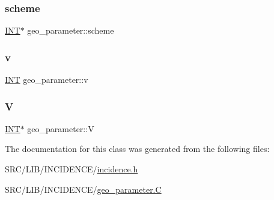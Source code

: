\mbox{\label{classgeo__parameter_af3459e6afcc79c081bc00cdc783301f8}} 
\subsubsection{\texorpdfstring{scheme}{scheme}}
{\footnotesize\ttfamily \mbox{\hyperlink{galois_8h_a09fddde158a3a20bd2dcadb609de11dc}{I\+NT}}$\ast$ geo\+\_\+parameter\+::scheme}

\mbox{\label{classgeo__parameter_a9c47846907cf86b351f4139e57c1127a}} 
\subsubsection{\texorpdfstring{v}{v}}
{\footnotesize\ttfamily \mbox{\hyperlink{galois_8h_a09fddde158a3a20bd2dcadb609de11dc}{I\+NT}} geo\+\_\+parameter\+::v}

\mbox{\label{classgeo__parameter_a253afaf1c892d8d280451e9ce53dd838}} 
\subsubsection{\texorpdfstring{V}{V}}
{\footnotesize\ttfamily \mbox{\hyperlink{galois_8h_a09fddde158a3a20bd2dcadb609de11dc}{I\+NT}}$\ast$ geo\+\_\+parameter\+::V}



The documentation for this class was generated from the following files\+:\begin{DoxyCompactItemize}
\item 
S\+R\+C/\+L\+I\+B/\+I\+N\+C\+I\+D\+E\+N\+C\+E/\mbox{\hyperlink{incidence_8h}{incidence.\+h}}\item 
S\+R\+C/\+L\+I\+B/\+I\+N\+C\+I\+D\+E\+N\+C\+E/\mbox{\hyperlink{geo__parameter_8_c}{geo\+\_\+parameter.\+C}}\end{DoxyCompactItemize}
